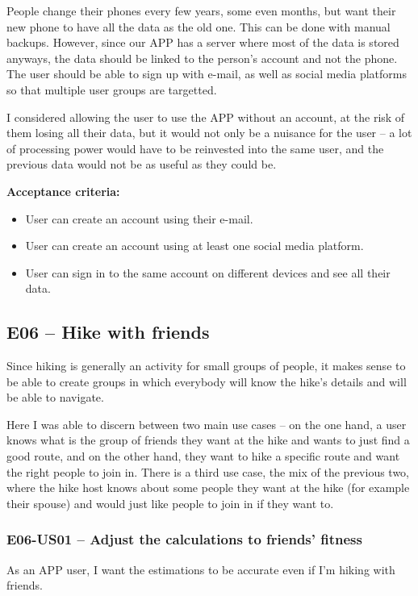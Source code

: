 People change their phones every few years, some even months, but want their new phone to have all the data as the old one.
This can be done with manual backups.
However, since our APP has a server where most of the data is stored anyways, the data should be linked to the person's account and not the phone.
The user should be able to sign up with e-mail, as well as social media platforms so that multiple user groups are targetted.

I considered allowing the user to use the APP without an account, at the risk of them losing all their data, but it would not only be a nuisance for the user --
a lot of processing power would have to be reinvested into the same user, and the previous data would not be as useful as they could be.

\textbf{Acceptance criteria:}
\begin{itemize}
    \item User can create an account using their e-mail.
    \item User can create an account using at least one social media platform.
    \item User can sign in to the same account on different devices and see all their data.
\end{itemize}


\subsection*{E06 -- Hike with friends}

Since hiking is generally an activity for small groups of people, it makes sense to be able to create groups in which everybody will know the hike's details and will be able to navigate.

Here I was able to discern between two main use cases -- on the one hand, a user knows what is the group of friends they want at the hike and wants to just find a good route,
and on the other hand, they want to hike a specific route and want the right people to join in.
There is a third use case, the mix of the previous two, where the hike host knows about some people they want at the hike (for example their spouse) and would just like people to join in if they want to.

\subsubsection*{E06-US01 -- Adjust the calculations to friends' fitness}
As an APP user, I want the estimations to be accurate even if I'm hiking with friends.


